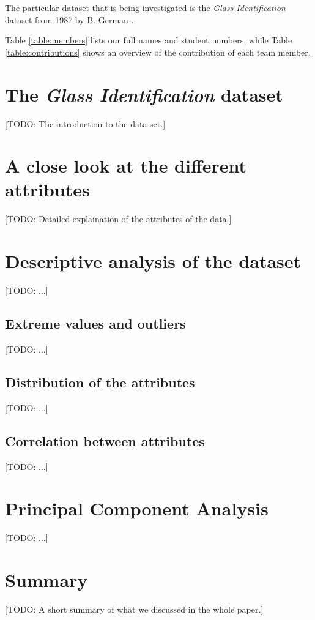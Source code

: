 \documentclass[dtu]{dtuarticle}
\newcommand{\todo}[1]{\color{red}[TODO: #1]\color{black}}
\begin{document}
	The particular dataset that is being investigated is the \textit{Glass Identification} dataset from 1987 by B. German \cite{dataset}.

	Table \ref{table:members} lists our full names and student numbers, while Table \ref{table:contributions} shows an overview of the contribution of each team member.

	\tableofcontents

	\newpage

	\section{The \textit{Glass Identification} dataset}

	\todo{The introduction to the data set.}

	\section{A close look at the different attributes}

	\todo{Detailed explaination of the attributes of the data.}

	\section{Descriptive analysis of the dataset}

	\todo{...}

	\subsection{Extreme values and outliers}

	\todo{...}

	\subsection{Distribution of the attributes}

	\todo{...}

	\subsection{Correlation between attributes}

	\todo{...}

	\section{Principal Component Analysis}

	\todo{...}

	\section*{Summary}

	\todo{A short summary of what we discussed in the whole paper.}

	
	
\end{document}

